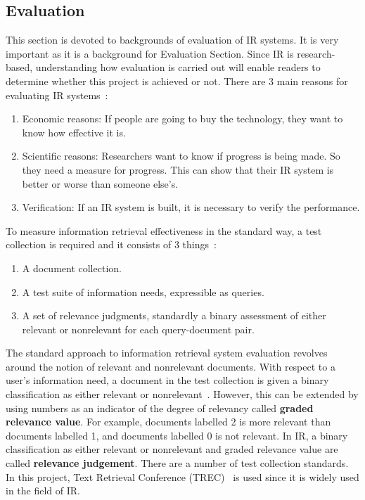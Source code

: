 \subsection{Evaluation}\label{sec:background_evaluation}
This section is devoted to backgrounds of evaluation of IR systems. It is very important as it is a background for Evaluation Section. 
Since IR is research-based, understanding how evaluation is carried out will enable readers to determine whether 
this project is achieved or not. There are 3 main reasons for evaluating IR systems~\cite[P. 3]{eval}: 
\begin{enumerate}
 \item Economic reasons: If people are going to buy the technology, they want to know how effective it is.
 \item Scientific reasons: Researchers want to know if progress is being made. So they need a measure for progress. 
	This can show that their IR system is better or worse than someone else's.
 \item Verification: If an IR system is built, it is necessary to verify the performance.
\end{enumerate}

To measure information retrieval effectiveness in the standard way, a test collection is required and it consists of 3 things~\cite{evalweb}:
\begin{enumerate}
 \item A document collection.
 \item A test suite of information needs, expressible as queries.
 \item A set of relevance judgments, standardly a binary assessment of either relevant or nonrelevant for each query-document pair.
\end{enumerate}

The standard approach to information retrieval system evaluation revolves around the notion of relevant and nonrelevant documents. With respect 
to a user's information need, a document in the test collection is given a binary classification as either relevant or nonrelevant~\cite{evalweb}. However,
this can be extended by using numbers as an indicator of the degree of relevancy called \textbf{graded relevance value}. For example, documents labelled 2 is more relevant than documents
labelled 1, and documents labelled 0 is not relevant. In IR, a binary classification as either relevant or nonrelevant and graded relevance value are
called \textbf{relevance judgement}.
There are a number of test collection standards. In this project, Text Retrieval Conference (TREC)~\cite{trec}
is used since it is widely used in the field of IR.


